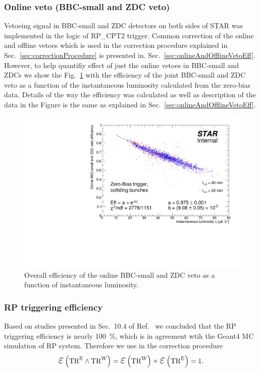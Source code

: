 \subsubsection{Online veto (BBC-small and ZDC veto)}\label{sec:onlineVetoEff}

Vetoeing signal in BBC-small and ZDC detectors on both sides of STAR was implemented in the logic of RP\_CPT2 trigger. Common correction of the online and offline vetoes which is used in the correction procedure explained in Sec.~\ref{sec:correctionProcedure} is presented in. Sec.~\ref{sec:onlineAndOfflineVetoEff}. However, to help quantifiy effect of just the online vetoes in BBC-small and ZDCs we show the Fig.~\ref{fig:onlineVetoEff} with the efficiency of the joint BBC-small and ZDC veto as a function of the instantaneous luminosity calculated from the zero-bias data. Details of the way the efficiency was calculated as well as description of the data in the Figure is the same as explained in Sec.~\ref{sec:onlineAndOfflineVetoEff}.
\begin{figure}[ht!]
\centering%
\includegraphics[width=0.65\linewidth,page=1]{graphics/corrections/OnlineVetoEffVsInstLumi_graph.pdf}%
\caption{Overall efficiency of the online BBC-small and ZDC veto as a function of instantaneous luminosity.}\label{fig:onlineVetoEff}%
\end{figure}

\subsubsection{RP triggering efficiency}\label{sec:rpTrigEff}

Based on studies presented in Sec.~10.4 of Ref.~\cite{supplementaryNote} we concluded that the RP triggering efficiency is nearly 100~\%, which is in agreement wtih the Geant4 MC simulation of RP system. Therefore we use in the correction procedure
\begin{equation}
\mbox{\LARGE$\varepsilon$}\left(\TRE\land\TRW\right) =  \mbox{\LARGE$\varepsilon$}\left(\TRW\right) \times \mbox{\LARGE$\varepsilon$}\left(\TRE\right) = 1.
\end{equation}


